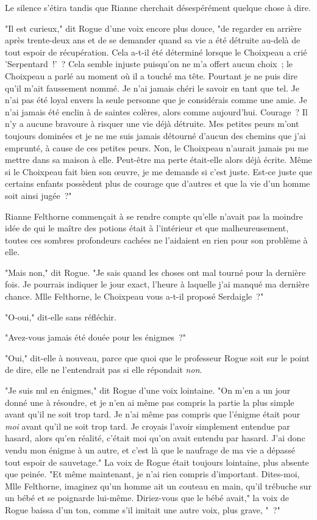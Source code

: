Le silence s'étira tandis que Rianne cherchait désespérément quelque chose à dire.

"Il est curieux," dit Rogue d'une voix encore plus douce, "de regarder en arrière après trente-deux ans et de se demander quand sa vie a été détruite au-delà de tout espoir de récupération. Cela a-t-il été déterminé lorsque le Choixpeau a crié 'Serpentard~!'~? Cela semble injuste puisqu'on ne m'a offert aucun choix~; le Choixpeau a parlé au moment où il a touché ma tête. Pourtant je ne puis dire qu'il m'ait faussement nommé. Je n'ai jamais chéri le savoir en tant que tel. Je n'ai pas été loyal envers la seule personne que je considérais comme une amie. Je n'ai jamais été enclin à de saintes colères, alors comme aujourd'hui. Courage~? Il n'y a aucune bravoure à risquer une vie déjà détruite. Mes petites peurs m'ont toujours dominées et je ne me suis jamais détourné d'aucun des chemins que j'ai emprunté, à cause de ces petites peurs. Non, le Choixpeau n'aurait jamais pu me mettre dans sa maison à elle. Peut-être ma perte était-elle alors déjà écrite. Même si le Choixpeau fait bien son œuvre, je me demande si c'est juste. Est-ce juste que certains enfants possèdent plus de courage que d'autres et que la vie d'un homme soit ainsi jugée~?"

Rianne Felthorne commençait à se rendre compte qu'elle n'avait pas la moindre idée de qui le maître des potions était à l'intérieur et que malheureusement, toutes ces sombres profondeurs cachées ne l'aidaient en rien pour son problème à elle.

"Mais non," dit Rogue. "Je sais quand les choses ont mal tourné pour la dernière fois. Je pourrais indiquer le jour exact, l'heure à laquelle j'ai manqué ma dernière chance. Mlle Felthorne, le Choixpeau vous a-t-il proposé Serdaigle~?"

"O-oui," dit-elle sans réfléchir.

"Avez-vous jamais été douée pour les énigmes~?"

"Oui," dit-elle à nouveau, parce que quoi que le professeur Rogue soit sur le point de dire, elle ne l'entendrait pas si elle répondait \emph{non}.

"Je suis nul en énigmes," dit Rogue d'une voix lointaine. "On m'en a un jour donné une à résoudre, et je n'en ai même pas compris la partie la plus simple avant qu'il ne soit trop tard. Je n'ai même pas compris que l'énigme était pour \emph{moi} avant qu'il ne soit trop tard. Je croyais l'avoir simplement entendue par hasard, alors qu'en réalité, c'était moi qu'on avait entendu par hasard. J'ai donc vendu mon énigme à un autre, et c'est là que le naufrage de ma vie a dépassé tout espoir de sauvetage." La voix de Rogue était toujours lointaine, plus absente que peinée. "Et même maintenant, je n'ai rien compris d'important. Dites-moi, Mlle Felthorne, imaginez qu'un homme ait un couteau en main, qu'il trébuche sur un bébé et se poignarde lui-même. Diriez-vous que le bébé avait," la voix de Rogue baissa d'un ton, comme s'il imitait une autre voix, plus grave, "~?"


